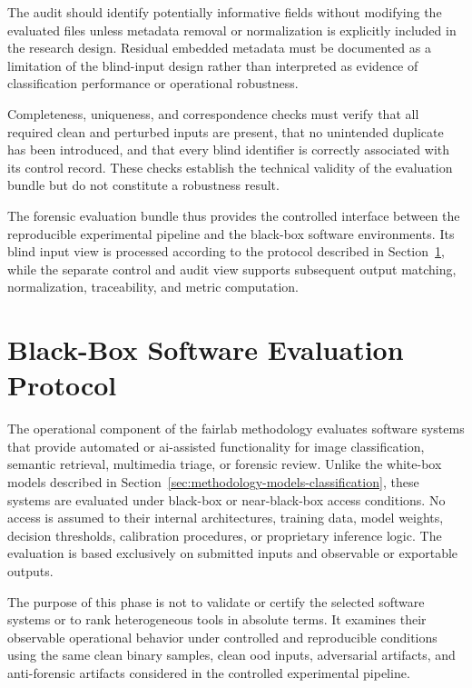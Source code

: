 The audit should identify potentially informative fields without modifying the
evaluated files unless metadata removal or normalization is explicitly included
in the research design. Residual embedded metadata must be documented as a
limitation of the blind-input design rather than interpreted as evidence of
classification performance or operational robustness.

Completeness, uniqueness, and correspondence checks must verify that all
required clean and perturbed inputs are present, that no unintended duplicate
has been introduced, and that every blind identifier is correctly associated
with its control record. These checks establish the technical validity of the
evaluation bundle but do not constitute a robustness result.

The forensic evaluation bundle thus provides the controlled interface between
the reproducible experimental pipeline and the black-box software environments.
Its blind input view is processed according to the protocol described in
Section~\ref{sec:methodology-forensic-tools}, while the separate control and
audit view supports subsequent output matching, normalization, traceability,
and metric computation.

\section{Black-Box Software Evaluation Protocol}
\label{sec:methodology-forensic-tools}

The operational component of the \gls{fairlab} methodology evaluates software
systems that provide automated or \gls{ai}-assisted functionality for image
classification, semantic retrieval, multimedia triage, or forensic review.
Unlike the white-box models described in
Section~\ref{sec:methodology-models-classification}, these systems are evaluated
under black-box or near-black-box access conditions. No access is assumed to
their internal architectures, training data, model weights, decision
thresholds, calibration procedures, or proprietary inference logic. The
evaluation is based exclusively on submitted inputs and observable or
exportable outputs.

The purpose of this phase is not to validate or certify the selected software
systems or to rank heterogeneous tools in absolute terms. It examines their
observable operational behavior under controlled and reproducible conditions
using the same clean binary samples, clean \gls{ood} inputs, adversarial
artifacts, and anti-forensic artifacts considered in the controlled
experimental pipeline.

